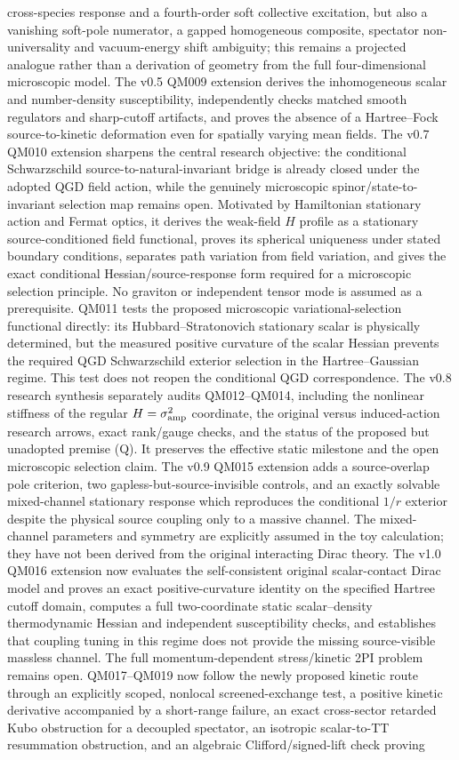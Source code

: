\documentclass[11pt,a4paper]{article}
\begin{document}
cross-species response and a fourth-order soft collective excitation, but also a vanishing soft-pole numerator, a gapped homogeneous composite, spectator non-universality and vacuum-energy shift ambiguity; this remains a projected analogue rather than a derivation of geometry from the full four-dimensional microscopic model. The v0.5 QM009 extension derives the inhomogeneous scalar and number-density susceptibility, independently checks matched smooth regulators and sharp-cutoff artifacts, and proves the absence of a Hartree--Fock source-to-kinetic deformation even for spatially varying mean fields. The v0.7 QM010 extension sharpens the central research objective: the conditional Schwarzschild source-to-natural-invariant bridge is already closed under the adopted QGD field action, while the genuinely microscopic spinor/state-to-invariant selection map remains open. Motivated by Hamiltonian stationary action and Fermat optics, it derives the weak-field $H$ profile as a stationary source-conditioned field functional, proves its spherical uniqueness under stated boundary conditions, separates path variation from field variation, and gives the exact conditional Hessian/source-response form required for a microscopic selection principle. No graviton or independent tensor mode is assumed as a prerequisite. QM011 tests the proposed microscopic variational-selection functional directly: its Hubbard--Stratonovich stationary scalar is physically determined, but the measured positive curvature of the scalar Hessian prevents the required QGD Schwarzschild exterior selection in the Hartree--Gaussian regime. This test does not reopen the conditional QGD correspondence. The v0.8 research synthesis separately audits QM012--QM014, including the nonlinear stiffness of the regular $H=\sigma_{\rm amp}^2$ coordinate, the original versus induced-action research arrows, exact rank/gauge checks, and the status of the proposed but unadopted premise (Q). It preserves the effective static milestone and the open microscopic selection claim. The v0.9 QM015 extension adds a source-overlap pole criterion, two gapless-but-source-invisible controls, and an exactly solvable mixed-channel stationary response which reproduces the conditional $1/r$ exterior despite the physical source coupling only to a massive channel. The mixed-channel parameters and symmetry are explicitly assumed in the toy calculation; they have not been derived from the original interacting Dirac theory. The v1.0 QM016 extension now evaluates the self-consistent original scalar-contact Dirac model and proves an exact positive-curvature identity on the specified Hartree cutoff domain, computes a full two-coordinate static scalar--density thermodynamic Hessian and independent susceptibility checks, and establishes that coupling tuning in this regime does not provide the missing source-visible massless channel. The full momentum-dependent stress/kinetic 2PI problem remains open. QM017--QM019 now follow the newly proposed kinetic route through an explicitly scoped, nonlocal screened-exchange test, a positive kinetic derivative accompanied by a short-range failure, an exact cross-sector retarded Kubo obstruction for a decoupled spectator, an isotropic scalar-to-TT resummation obstruction, and an algebraic Clifford/signed-lift check proving 
\end{document}
